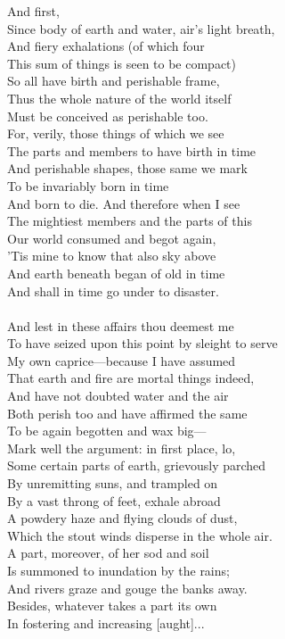 
And first,\\
Since body of earth and water, air's light breath,\\
And fiery exhalations (of which four\\
This sum of things is seen to be compact)\\
So all have birth and perishable frame,\\
Thus the whole nature of the world itself\\
Must be conceived as perishable too.\\
For, verily, those things of which we see\\
The parts and members to have birth in time\\
And perishable shapes, those same we mark\\
To be invariably born in time\\
And born to die. And therefore when I see\\
The mightiest members and the parts of this\\
Our world consumed and begot again,\\
'Tis mine to know that also sky above\\
And earth beneath began of old in time\\
And shall in time go under to disaster.\\
\\
And lest in these affairs thou deemest me\\
To have seized upon this point by sleight to serve\\
My own caprice—because I have assumed\\
That earth and fire are mortal things indeed,\\
And have not doubted water and the air\\
Both perish too and have affirmed the same\\
To be again begotten and wax big—\\
Mark well the argument: in first place, lo,\\
Some certain parts of earth, grievously parched\\
By unremitting suns, and trampled on\\
By a vast throng of feet, exhale abroad\\
A powdery haze and flying clouds of dust,\\
Which the stout winds disperse in the whole air.\\
A part, moreover, of her sod and soil\\
Is summoned to inundation by the rains;\\
And rivers graze and gouge the banks away.\\
Besides, whatever takes a part its own\\
In fostering and increasing [aught]...

